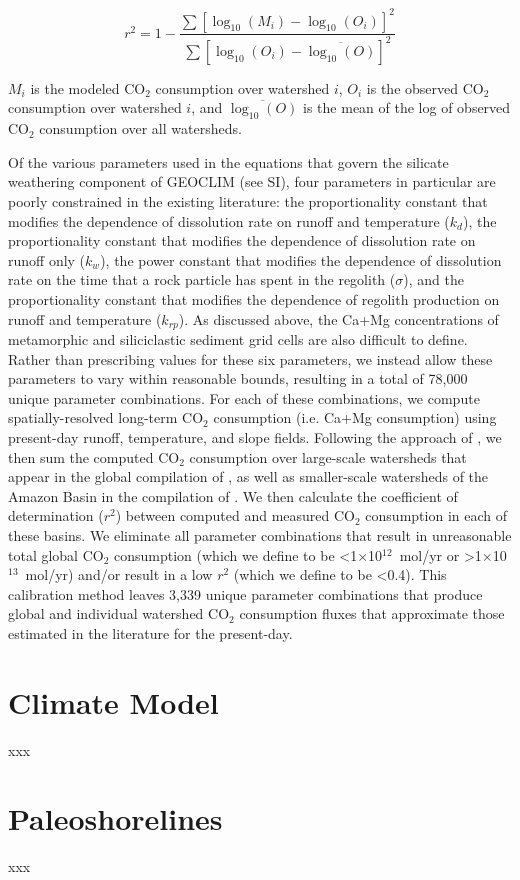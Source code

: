 \documentclass[11pt,letterpaper]{article}
\newcommand{\COtwo}{CO$_{2}$\xspace}
\begin{document}
\begin{equation}
    r^{2} = 1 - \frac{\sum\left[ \log_{10}(M_{i}) - \log_{10}(O_{i}) \right]^{2}}{\sum\left[ \log_{10}(O_{i}) - \overline{\log_{10}(O)} \right]^{2}}
    \label{eq:10}
\end{equation}

\noindent
$M_{i}$ is the modeled \COtwo consumption over watershed $i$, $O_{i}$ is the observed \COtwo consumption over watershed $i$, and $\overline{\log_{10}(O)}$ is the mean of the log of observed \COtwo consumption over all watersheds.



Of the various parameters used in the equations that govern the silicate weathering component of GEOCLIM (see SI), four parameters in particular are poorly constrained in the existing literature: the proportionality constant that modifies the dependence of dissolution rate on runoff and temperature ($k_{d}$), the proportionality constant that modifies the dependence of dissolution rate on runoff only ($k_{w}$), the power constant that modifies the dependence of dissolution rate on the time that a rock particle has spent in the regolith ($\sigma$), and the proportionality constant that modifies the dependence of regolith production on runoff and temperature ($k_{rp}$). As discussed above, the Ca+Mg concentrations of metamorphic and siliciclastic sediment grid cells are also difficult to define. Rather than prescribing values for these six parameters, we instead allow these parameters to vary within reasonable bounds, resulting in a total of 78,000 unique parameter combinations. For each of these combinations, we compute spatially-resolved long-term \COtwo consumption (i.e. Ca+Mg consumption) using present-day runoff, temperature, and slope fields. Following the approach of \citet{Maffre2018a}, we then sum the computed \COtwo consumption over large-scale watersheds that appear in the global compilation of \citet{Gaillardet1999a}, as well as smaller-scale watersheds of the Amazon Basin in the compilation of \citet{Moquet2011a, Moquet2016a, Moquet2018a}. We then calculate the coefficient of determination ($r^{2}$) between computed and measured \COtwo consumption in each of these basins. We eliminate all parameter combinations that result in unreasonable total global \COtwo consumption (which we define to be \textless1$\times$10$^{12}$~mol/yr or \textgreater1$\times$10$^{13}$~mol/yr) and/or result in a low $r^{2}$ (which we define to be \textless0.4). This calibration method leaves 3,339 unique parameter combinations that produce global and individual watershed \COtwo consumption fluxes that approximate those estimated in the literature for the present-day.

\section*{Climate Model}

xxx

\section*{Paleoshorelines}

xxx

\clearpage

\singlespacing

\newpage



\end{document}
